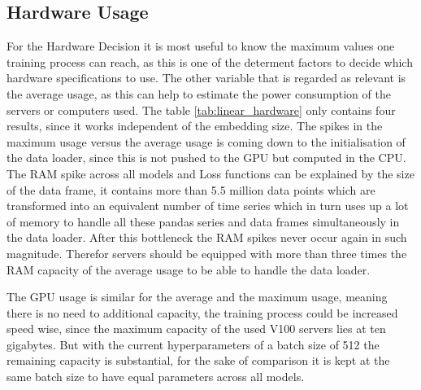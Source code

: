 \documentclass{article}
\begin{document}
\subsection{Hardware Usage}

For the Hardware Decision it is most useful to know the maximum values one training process can reach, as this is one of the determent factors to decide which hardware specifications to use. The other variable that is regarded as relevant is the average usage, as this can help to estimate the power consumption of the servers or computers used. The table \ref{tab:linear_hardware} only contains four results, since it works independent of the embedding size. The spikes in the maximum usage versus the average usage is coming down to the initialisation of the data loader, since this is not pushed to the GPU but computed in the CPU. The RAM spike across all models and Loss functions can be explained by the size of the data frame, it contains more than 5.5 million data points which are transformed into an equivalent number of time series which in turn uses up a lot of memory to handle all these pandas series and data frames simultaneously in the data loader. After this bottleneck the RAM spikes never occur again in such magnitude. Therefor servers should be equipped with more than three times the RAM capacity of the average usage to be able to handle the data loader. \par 
The GPU usage is similar for the average and the maximum usage, meaning there is no need to additional capacity, the training process could be increased speed wise, since the maximum capacity of the used V100 servers lies at ten gigabytes. But with the current hyperparameters of a batch size of 512 the remaining capacity is substantial, for the sake of comparison it is kept at the same batch size to have equal parameters across all models. 
\end{document}
